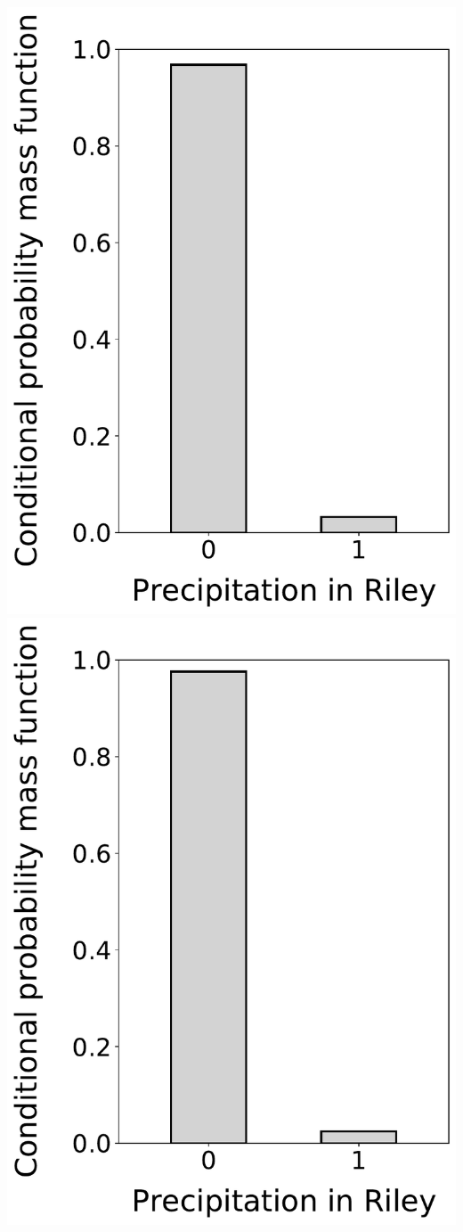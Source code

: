 \documentclass[12pt,twoside]{article}
\begin{document}
\begin{enumerate}
\includegraphics[scale=.5]{precipitation_cond_pmf_3_given_1eq0.pdf}
\includegraphics[scale=.5]{precipitation_cond_pmf_3_given_1eq0_2eq0.pdf}

\end{enumerate}
\end{document}
